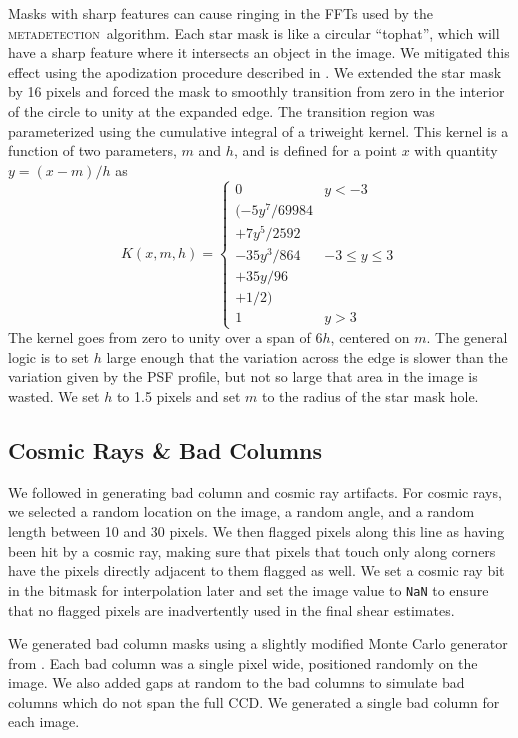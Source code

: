 \documentclass[twocolumn,twocolappendix,astrosym]{openjournal}
\newcommand{\mdet}{\textsc{metadetection}}
\begin{document}
Masks with sharp features can cause ringing in the FFTs used by the \mdet\
algorithm.   Each star mask is like a circular ``tophat'', which will have a
sharp feature where it intersects an object in the image.  We mitigated this
effect using the apodization procedure described in \citet{BeckerMdetCoadd}. We
extended the star mask by 16 pixels and forced the mask to smoothly transition
from zero in the interior of the circle to unity at the expanded edge. The
transition region was parameterized using the cumulative integral of a
triweight kernel. This kernel is a function of two parameters, $m$ and $h$, and
is defined for a point $x$ with quantity $y = (x-m)/h$ as
\begin{equation}
K(x, m, h) = \begin{cases}
0 & y < -3 \\
(-5y^7 / 69984 \\
+ 7y^5 / 2592 \\
- 35y^3 / 864 & -3 \le y \le 3 \\
+ 35y / 96 \\
+ 1 / 2) \\
1 & y > 3
\end{cases}
\end{equation}
The kernel goes from zero to unity over a span of $6h$, centered on $m$.
The general logic is to set $h$ large enough that the variation across the edge is slower
than the variation given by the PSF profile, but not so large that area in the image is
wasted. We set $h$ to 1.5 pixels and set $m$ to the radius of the star mask hole.

\subsection{Cosmic Rays \& Bad Columns} \label{sec:sim:cosmics_badcols}

We followed \citet{BeckerMdetCoadd} in generating bad column and cosmic ray artifacts.
For cosmic rays, we selected a random location on the image, a random angle, and a random
length between 10 and 30 pixels. We then flagged pixels along this line as having been hit
by a cosmic ray, making sure that pixels that touch only along corners have the pixels
directly adjacent to them flagged as well. We set a cosmic ray bit in the bitmask for
interpolation later and set the image value to \texttt{NaN} to ensure that no flagged
pixels are inadvertently used in the final shear estimates.

We generated bad column masks using a slightly modified Monte Carlo generator
from \citet{BeckerMdetCoadd}. Each bad column was a single pixel wide,
positioned randomly on the image. We also added gaps at random to the bad
columns to simulate bad columns which do not span the full CCD.  We generated
a single bad column for each image.
\end{document}
